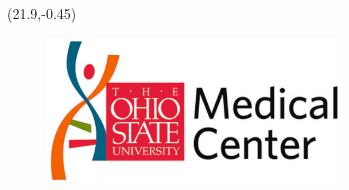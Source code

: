 \documentclass[a0]{a0poster}
\def\LHead#1{\noindent{\LARGE\color{black} #1}\medskip}
\begin{document}
\begin{textblock}{23}(21.9,-0.45)
\begin{figure}
\includegraphics[height=1.5in]{pics/Ohio_state_med}
\end{figure}
\end{textblock}

%



\end{document}
